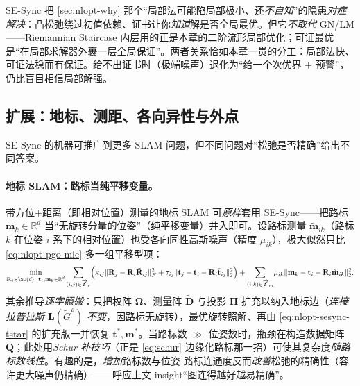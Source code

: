\begin{insight}[可证最优 $=$ 凸松弛 $+$ 事后证书；与本章局部法互补]
SE-Sync 把 \cref{sec:nlopt-why} 那个“局部法可能陷局部极小、还\emph{不自知}”的隐患\emph{对症解决}：凸松弛绕过初值依赖、证书让你\emph{知道}解是否全局最优。但它\emph{不取代} GN/LM——Riemannian Staircase 内层用的正是本章的二阶流形局部优化；可证最优是“在局部求解器外裹一层全局保证”。两者关系恰如本章一贯的分工：局部法快、可证法稳而有保证。给不出证书时（极端噪声）退化为“给一个次优界 $+$ 预警”，仍比盲目相信局部解强。
\end{insight}

\subsection{扩展：地标、测距、各向异性与外点}
\label{sec:nlopt-certifiable-ext}

SE-Sync 的机器可推广到更多 SLAM 问题，但不同问题对“松弛是否精确”给出不同答案\cite{rosen2019sesync,carlone2026handbook}。

\paragraph{地标 SLAM：路标当纯平移变量。}\cite{rosen2019sesync}
带方位$+$距离（即相对位置）测量的地标 SLAM 可\emph{原样}套用 SE-Sync——把路标 $\mathbf{m}_k\in\mathbb{R}^d$ 当“无旋转分量的位姿”（纯平移变量）并入即可。设路标测量 $\tilde{\mathbf{m}}_{ik}$（路标 $k$ 在位姿 $i$ 系下的相对位置）也受各向同性高斯噪声（精度 $\mu_{ik}$），极大似然只比 \cref{eq:nlopt-pgo-mle} 多一组平移型项：
\begin{equation}
  \min_{\substack{\mathbf{R}_i\in\SO(d),\ \mathbf{t}_i,\mathbf{m}_k\in\mathbb{R}^d}}
  \sum_{(i,j)\in\overrightarrow{\mathcal{E}}_r}\!\Big(\kappa_{ij}\|\mathbf{R}_j-\mathbf{R}_i\tilde{\mathbf{R}}_{ij}\|_F^2+\tau_{ij}\|\mathbf{t}_j-\mathbf{t}_i-\mathbf{R}_i\tilde{\mathbf{t}}_{ij}\|_2^2\Big)
  +\sum_{(i,k)\in\overrightarrow{\mathcal{E}}_m}\!\mu_{ik}\|\mathbf{m}_k-\mathbf{t}_i-\mathbf{R}_i\tilde{\mathbf{m}}_{ik}\|_2^2.
  \label{eq:nlopt-landmark-mle}
\end{equation}
其余推导\emph{逐字照搬}：只把权阵 $\boldsymbol{\Omega}$、测量阵 $\tilde{\mathbf{D}}$ 与投影 $\boldsymbol{\Pi}$ 扩充以纳入地标边（\emph{连接拉普拉斯 $\mathbf{L}(\tilde{G}^\rho)$ 不变}，因路标无旋转），最优旋转照解、再由 \cref{eq:nlopt-sesync-tstar} 的扩充版一并恢复 $\mathbf{t}^*,\mathbf{m}^*$。当路标数 $\gg$ 位姿数时，瓶颈在构造数据矩阵 $\tilde{\mathbf{Q}}$；此处用\emph{Schur 补技巧}（正是 \cref{eq:schur} 边缘化路标那一招）可使其复杂度\emph{随路标数线性}。有趣的是，\emph{增加}路标数与位姿-路标连通度反而\emph{改善}松弛的精确性（容许更大噪声仍精确）——呼应上文 insight“图连得越好越易精确”。

